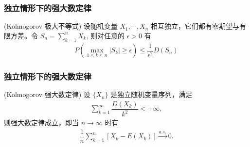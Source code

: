 \begin{frame}
	\frametitle{独立情形下的强大数定律}
	\begin{thm}
		({\rm Kolmogorov} 极大不等式) 设随机变量 $X_1,\cdots, X_n$ 相互独立，它们都有零期望与有限方差。令 $S_n=\sum_{k=1}^nX_k$, 则对任意的 $\epsilon>0$ 有
		\begin{eqnarray*}
			P(\max_{1\leq k\leq n}|S_k|\geq \epsilon)\leq \dfrac{1}{\epsilon^2}D(S_n)
		\end{eqnarray*}

	\end{thm}



\end{frame}



\begin{frame}
	\frametitle{独立情形下的强大数定律}

	\begin{thm}
		({\rm Kolmogorov} 强大数定律) 设 $\{X_n\}$ 是独立随机变量序列，满足
		\begin{eqnarray*}
			\sum_{k=1}^\infty\dfrac{D(X_k)}{k^2}<+\infty,
		\end{eqnarray*}
		则强大数定律成立，即当 $n\rightarrow\infty$ 时有
		\begin{eqnarray*}
			\dfrac{1}{n}\sum_{k=1}^n[X_k-E(X_k)]\stackrel{a.s.}{\rightarrow}0.\end{eqnarray*}

	\end{thm}





\end{frame}





